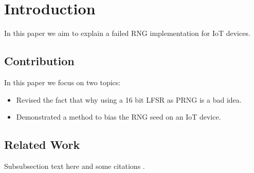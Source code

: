 \section{Introduction}

In this paper we aim to explain a failed RNG implementation for IoT devices.

\subsection{Contribution}
In this paper we focus on two topics:
\begin{itemize}
\item Revised the fact that why using a 16 bit LFSR as PRNG is a bad idea.
\item Demonstrated a method to bias the RNG seed on an IoT device.
\end{itemize}

\subsection{Related Work}
Subsubsection text here and some citations \cite{IEEEexample:conf_typical} \cite{IEEEexample:articledualmonths}.
